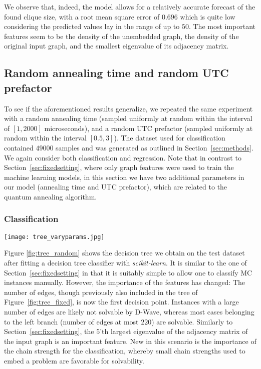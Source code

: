 \documentclass[a4paper,11pt]{article}
\begin{document}
We observe that, indeed, the model allows for a relatively accurate forecast of the found clique size, with a root mean square error of $0.696$ which is quite low considering the predicted values lay in the range of up to $50$. The most important features seem to be the density of the unembedded graph, the density of the original input graph, and the smallest eigenvalue of its adjacency matrix.

\subsection{Random annealing time and random UTC prefactor}
\label{sec:randomsetting}
To see if the aforementioned results generalize, we repeated the same experiment with a random annealing time (sampled uniformly at random within the interval of $[1,2000]$ microseconds), and a random UTC prefactor (sampled uniformly at random within the interval $[0.5,3]$). The dataset used for classification contained $49000$ samples and was generated as outlined in Section~\ref{sec:methods}. We again consider both classification and regression. Note that in contrast to Section~\ref{sec:fixedsetting}, where only graph features were used to train the  machine learning models, in this section we have two additional parameters in our model (annealing time and UTC prefactor), which are related to the quantum annealing algorithm.

\subsubsection{Classification}
\begin{figure*}
    \centering
    \texttt{[image: tree\_varyparams.jpg]}
    \caption{Decision tree for classification of MC instances into solvable and unsolvable, using the features outlined in Section~\ref{sec:methods}. Setting of random annealing time and random UTC prefactor. Left branches denote \textit{true} bifurcations, right branches denote \textit{false} bifurcations. Green leaves are solvable cases, red leaves are unsolvable cases, and inner nodes are colored in blue.\label{fig:tree_random}}
\end{figure*}
Figure \ref{fig:tree_random} shows the decision tree we obtain on the test dataset after fitting a decision tree classifier with \textit{scikit-learn}. It is similar to the one of Section~\ref{sec:fixedsetting} in that it is suitably simple to allow one to classify MC instances manually. However, the importance of the features has changed: The number of edges, though previously also included in the tree of Figure~\ref{fig:tree_fixed}, is now the first decision point. Instances with a large number of edges are likely not solvable by D-Wave, whereas most cases belonging to the left branch (number of edges at most $220$) are solvable. Similarly to Section~\ref{sec:fixedsetting}, the $5$'th largest eigenvalue of the adjacency matrix of the input graph is an important feature. New in this scenario is the importance of the chain strength for the classification, whereby small chain strengths used to embed a problem are favorable for solvability.
\end{document}
